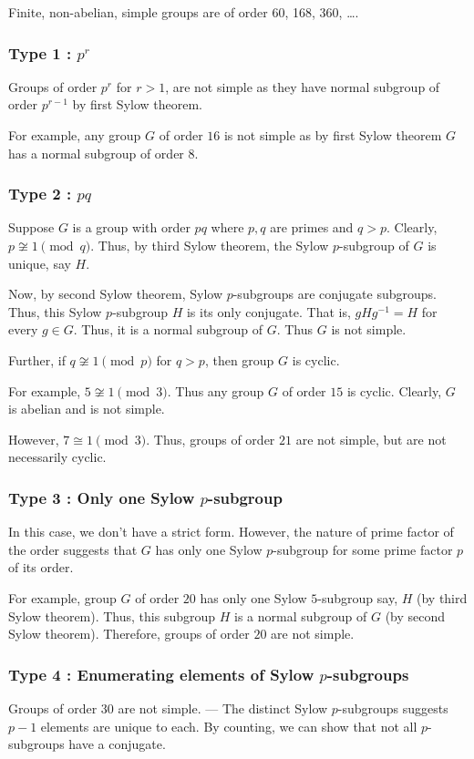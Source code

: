 \begin{remark}
Finite, non-abelian, simple groups are of order 60, 168, 360, \dots. 
\end{remark}

\subsubsection*{Type 1 : $p^r$}
	Groups of order $p^r$ for $r>1$, are not simple as they have normal subgroup of order $p^{r-1}$ by first Sylow theorem.
	
	For example, any group $G$ of order $16$ is not simple as by first Sylow theorem $G$ has a normal subgroup of order $8$.

\subsubsection*{Type 2 : $pq$}
	Suppose $G$ is a group with order $pq$ where $p,q$ are primes and $q > p$. Clearly, $p \not\cong 1 \pmod{q}$. Thus, by third Sylow theorem, the Sylow $p$-subgroup of $G$ is unique, say $H$.
	
	Now, by second Sylow theorem, Sylow $p$-subgroups are conjugate subgroups. Thus, this Sylow $p$-subgroup $H$ is its only conjugate. That is, $gHg^{-1} = H$ for every $g \in G$. Thus, it is a normal subgroup of $G$. Thus $G$ is not simple.

	Further, if $q \not\cong 1 \pmod{p}$ for $q > p$, then group $G$ is cyclic.
	
	For example, $5 \not\cong 1 \pmod{3}$. Thus any group $G$ of order $15$ is cyclic. Clearly, $G$ is abelian and is not simple.
	
	However, $7 \cong 1 \pmod{3}$. Thus, groups of order $21$ are not simple, but are not necessarily cyclic.

\subsubsection*{Type 3 : Only one Sylow $p$-subgroup}
	In this case, we don't have a strict form. However, the nature of prime factor of the order suggests that $G$ has only one Sylow $p$-subgroup for some prime factor $p$ of its order.

	For example, group $G$ of order $20$ has only one Sylow $5$-subgroup say, $H$ (by third Sylow theorem). Thus, this subgroup $H$ is a normal subgroup of $G$ (by second Sylow theorem). Therefore, groups of order $20$ are not simple.

\subsubsection*{Type 4 : Enumerating elements of Sylow $p$-subgroups}
	Groups of order $30$ are not simple. --- The distinct Sylow $p$-subgroups suggests $p-1$ elements are unique to each. By counting, we can show that not all $p$-subgroups have a conjugate.

